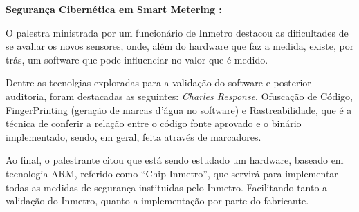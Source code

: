 
\textbf{Segurança Cibernética em Smart Metering :}

O palestra ministrada por um funcionário de Inmetro destacou as dificultades de
se avaliar os novos sensores, onde, além do hardware que faz a medida, existe,
por trás, um software que pode influenciar no valor que é medido.

Dentre as tecnolgias exploradas para a validação do software e posterior
auditoria, foram destacadas as seguintes: \textit{Charles Response}, Ofuscação
de Código, FingerPrinting (geração de marcas d'água no software) e
Rastreabilidade, que é a técnica de conferir a relação entre o código fonte
aprovado e o binário implementado, sendo, em geral, feita através de marcadores.

Ao final, o palestrante citou que está sendo estudado um hardware, baseado em
tecnologia ARM, referido como ``Chip Inmetro'', que servirá para implementar
todas as medidas de segurança instituidas pelo Inmetro. Facilitando tanto a
validação do Inmetro, quanto a implementação por parte do fabricante.

